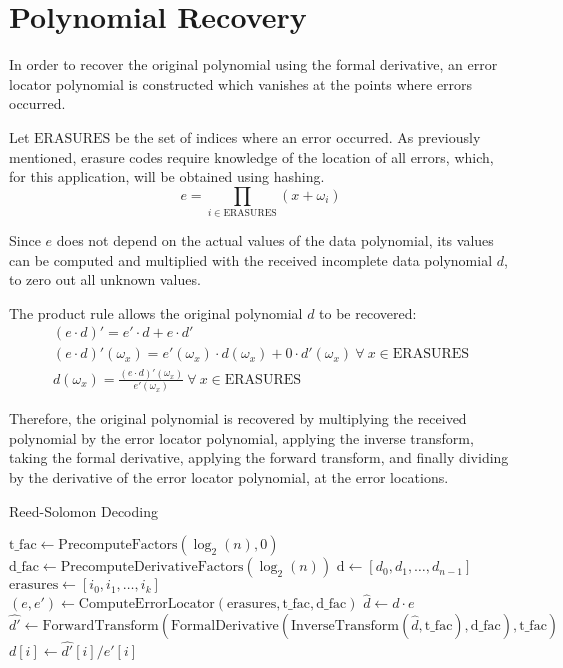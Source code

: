 \section{Polynomial Recovery}

In order to recover the original polynomial using the formal derivative, an error locator polynomial is constructed which vanishes at the points where errors occurred.

Let $\text{ERASURES}$ be the set of indices where an error occurred. As previously mentioned, erasure codes require knowledge of the location of all errors, which, for this application, will be obtained using hashing.
\[e = \prod_{i \in \text{ERASURES}} (x + \omega_i)\]

Since $e$ does not depend on the actual values of the data polynomial, its values can be computed and multiplied with the received incomplete data polynomial $d$, to zero out all unknown values.

The product rule allows the original polynomial $d$ to be recovered:
\begin{gather*}
(e \cdot d)' = e' \cdot d + e \cdot d'\\
(e \cdot d)'(\omega_x) = e'(\omega_x) \cdot d(\omega_x) + 0 \cdot d'(\omega_x)\ \forall\ x \in \text{ERASURES}\\
d(\omega_x) = \frac{(e \cdot d)'(\omega_x)}{e'(\omega_x)}\ \forall\ x \in \text{ERASURES}
\end{gather*}

Therefore, the original polynomial is recovered by multiplying the received polynomial by the error locator polynomial, applying the inverse transform, taking the formal derivative, applying the forward transform,
and finally dividing by the derivative of the error locator polynomial, at the error locations.

\begin{algorithm}
    \caption{Reed-Solomon Decoding}
    \begin{algorithmic}
        \State $\text{t\_fac} \gets \text{PrecomputeFactors}(\log_2(n), 0)$
        \State $\text{d\_fac} \gets \text{PrecomputeDerivativeFactors}(\log_2(n))$
        \State $\text{d} \gets [d_0, d_1, \ldots, d_{n - 1}]$ 
        \State $\text{erasures} \gets [i_0, i_1, \ldots, i_k]$ 
        \State $(e, e') \gets \text{ComputeErrorLocator}(\text{erasures}, \text{t\_fac}, \text{d\_fac})$
        \State $\hat{d} \gets d \cdot e$ 
        \State $\hat{d'} \gets \text{ForwardTransform}(\text{FormalDerivative}(\text{InverseTransform}(\hat{d}, \text{t\_fac}), \text{d\_fac}), \text{t\_fac})$
            \State $d[i] \gets \hat{d'}[i] / e'[i]$
        \EndFor
    \end{algorithmic}
\end{algorithm}

